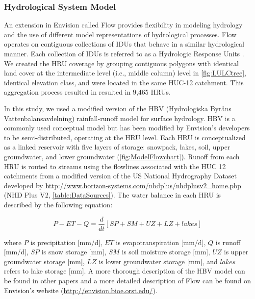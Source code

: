 \documentclass[water,article,submit,moreauthors,pdftex,10pt,a4paper]{mdpi}
\theoremstyle{mdpi}
\newcounter{ex}
\newcounter{re}
\theoremstyle{mdpidefinition}
\begin{document}
\subsubsection{Hydrological System Model}

An extension in Envision called Flow provides flexibility in modeling hydrology and the use of different model representations of hydrological processes. Flow operates on contiguous collections of IDUs that behave in a similar hydrological manner. Each collection of IDUs is referred to as a Hydrologic Response Units \citep[HRUs,][]{Jin:2011ii,Turner:2016ia}. We created the HRU coverage by grouping contiguous polygons with identical land cover at the intermediate level (i.e., middle column) level in \cref{fig:LULCtree}, identical elevation class, and were located in the same HUC-12 catchment. This aggregation process resulted in resulted in 9,465 HRUs.

In this study, we used a modified version of the HBV (Hydrologiska Byr\r{a}ns Vattenbalansavdelning) rainfall-runoff model \citep{Bergstrom:1976tr} for surface hydrology. HBV is a commonly used conceptual model \citep{Seibert:2000wi,Woodsmith:2007vz,Abebe:2010to,Bergstrom:2015ck} but has been modified by Envision’s developers to be semi-distributed, operating at the HRU level. Each HRU is conceptualized as a linked reservoir with five layers of storage: snowpack, lakes, soil, upper groundwater, and lower groundwater (\cref{fig:ModelFlowchart}). Runoff from each HRU is routed to streams using the flowlines associated with the HUC 12 catchments from a modified version of the US National Hydrography Dataset developed by \href{Horizon Systems, Inc.}{http://www.horizon-systems.com/nhdplus/nhdplusv2\_home.php} (NHD Plus V2, \cref{table:DataSources}). The water balance in each HRU is described by the following equation:

\begin{equation}
P - ET - Q = \frac{d}{dt}\left[SP + SM + UZ + LZ + lakes\right]
\end{equation}

where $P$ is precipitation [mm/d], $ET$ is evapotranspiration [mm/d], $Q$ is runoff [mm/d], $SP$ is snow storage [mm], $SM$ is soil moisture storage [mm], $UZ$ is upper groundwater storage [mm], $LZ$ is lower groundwater storage [mm], and $lakes$ refers to lake storage [mm]. A more thorough description of the HBV model can be found in other papers \citep{Seibert:1999vg,Bergstrom:2015ck} and a more detailed description of Flow can be found on Envision’s website (\href{http://envision.bioe.orst.edu/}{http://envision.bioe.orst.edu/}).
\end{document}
